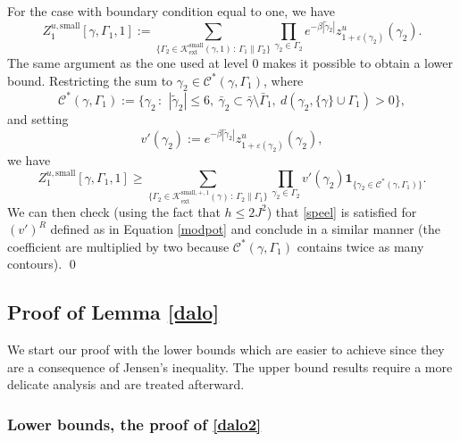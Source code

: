 \documentclass[10pt]{amsart}
\let\mathcal\mathscr
\newcommand{\sep}{\,:\,}
\numberwithin{equation}{section}
\theoremstyle{plain}
\theoremstyle{definition}
\newcommand{\ext}{\mathrm{ext}}
\newcommand{\sm}{\mathrm{small}}
\newcommand{\ind}{\mathbf{1}}
\newcommand{\cC}{{\ensuremath{\mathcal C}} }
\newcommand{\cK}{{\ensuremath{\mathcal K}} }
\newcommand{\gb}{\beta}
\newcommand{\gep}{\varepsilon}
\newcommand{\gG}{\Gamma}
\begin{document}
For the case with boundary condition equal to one, we have
\begin{equation}\label{sumikr}
Z^{u,\sm}_{1}[\gamma,\gG_1,1]:= \sum_{\{ \gG_2 \in \cK^{\sm}_{\ext}(\gamma,1) \sep \gG_1 \parallel \gG_2\}}
\prod_{\gamma_2\in \gG_2 }
e^{-\gb |\tilde\gamma_2|}
z^u_{1+\gep(\gamma_2)}(\gamma_2).
\end{equation}
The same argument as the one used at level $0$ makes it possible to obtain a lower bound.
Restric\-ting the sum to $\gamma_2\in \cC^{*}(\gamma,\gG_1)$, where
\[
\cC^{*}(\gamma,\gG_1):=\{ \gamma_2 \sep \ |\tilde \gamma_2|\le 6,\ \bar \gamma_2\subset \bar \gamma \setminus \bar \gG_1,\
d(\gamma_2, \{\gamma\}\cup \gG_1)>0 \},
\]
and setting
\[
v'(\gamma_2):=e^{-\gb |\tilde\gamma_2|}
z^u_{1+\gep(\gamma_2)}(\gamma_2),
\]
we have
\begin{equation*}
Z^{u,\sm}_{1}[\gamma,\gG_1,1]
\ge \sum_{\{ \gG_2 \in \cK^{\sm,+,1}_{\ext}(\gamma) \sep \gG_2 \parallel \gG_1\}} \prod_{\gamma_2\in \gG_2 }
v'(\gamma_2)\ind_{\{\gamma_2\in \cC^*(\gamma,\gG_1)\}}.
\end{equation*}
We can then check (using the fact that $h\le 2J^2$) that \eqref{speel} is satisfied for $(v')^R$ defined as in Equation \eqref{modpot}
and conclude in a similar manner (the coefficient are multiplied by two because $\cC^{*}(\gamma,\gG_1)$ contains twice as many contours).
\qed

\subsection{Proof of Lemma \ref{dalo}}

We start our proof with the lower bounds which are easier to achieve since they are a consequence of Jensen's inequality.
The upper bound results require a more delicate analysis and are treated afterward.

\subsubsection{Lower bounds, the proof of \eqref{dalo2}}
\end{document}
